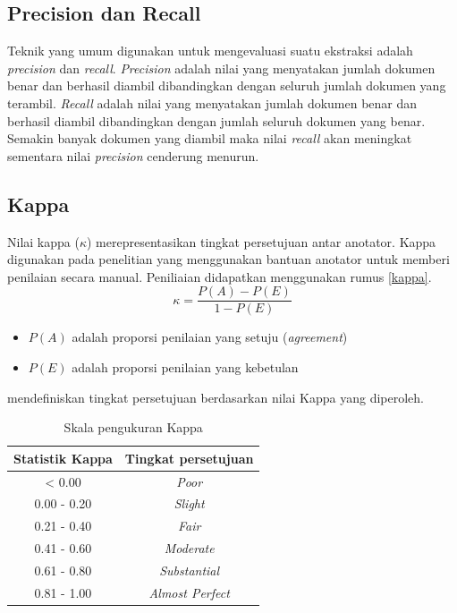 \subsection{Precision dan Recall}
Teknik yang umum digunakan untuk mengevaluasi suatu ekstraksi adalah \textit{precision} dan \textit{recall}. \textit{Precision} adalah nilai yang menyatakan jumlah dokumen benar dan berhasil diambil dibandingkan dengan seluruh jumlah dokumen yang terambil. \textit{Recall} adalah nilai yang menyatakan jumlah dokumen benar dan berhasil diambil dibandingkan dengan jumlah seluruh dokumen yang benar. Semakin banyak dokumen yang diambil maka nilai \textit{recall} akan meningkat sementara nilai \textit{precision} cenderung menurun. 

\subsection{Kappa}
Nilai kappa ($\kappa$) merepresentasikan tingkat persetujuan antar anotator. Kappa digunakan pada penelitian yang menggunakan bantuan anotator untuk memberi penilaian secara manual. Peniliaian didapatkan menggunakan rumus \ref{kappa}.
\begin{equation}
\label{kappa}
\kappa=\frac{P(A)-P(E)}{1-P(E)}
\end{equation}
\begin{itemize}
  \item $P(A)$ adalah proporsi penilaian yang setuju (\textit{agreement})
  \item $P(E)$ adalah proporsi penilaian yang kebetulan
\end{itemize}

\noindent \cite{landis1977measurement} mendefiniskan tingkat persetujuan berdasarkan nilai Kappa yang diperoleh. 
\begin{table}
  \centering
    \caption{Skala pengukuran Kappa}
    \label{table:skalaKappa}
    \begin{tabular}{|c|c|}
      \hline
      Statistik Kappa & Tingkat persetujuan \\ \hline
      < 0.00 & \textit{Poor} \\ \hline
      0.00 - 0.20 & \textit{Slight} \\ \hline
      0.21 - 0.40 & \textit{Fair} \\ \hline
      0.41 - 0.60 & \textit{Moderate} \\ \hline
      0.61 - 0.80 & \textit{Substantial} \\ \hline
      0.81 - 1.00 & \textit{Almost Perfect} \\ \hline
    \end{tabular}
\end{table}

